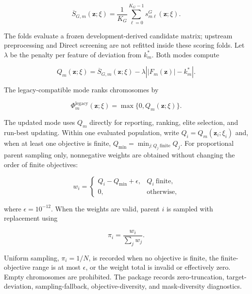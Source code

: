 \begin{equation}
\overline S_{G,m}(\mathbf z;\xi)=\frac{1}{K_G}\sum_{\ell=0}^{K_G-1}s^{G}_{m\ell}(\mathbf z;\xi).
\label{eq:ga-fold-score}
\end{equation}

The folds evaluate a frozen development-derived candidate matrix; upstream preprocessing and Direct screening are not refitted inside these scoring folds. Let \(\lambda\) be the penalty per feature of deviation from \(k_m^{\ast}\). Both modes compute

\begin{equation}
Q_m(\mathbf z;\xi)=\overline S_{G,m}(\mathbf z;\xi)-\lambda\left||F_m(\mathbf z)|-k_m^{\ast}\right|.
\label{eq:raw-objective}
\end{equation}

The legacy-compatible mode ranks chromosomes by

\begin{equation}
\Phi_m^{\mathrm{legacy}}(\mathbf z;\xi)=\max\{0,Q_m(\mathbf z;\xi)\}.
\label{eq:legacy-fitness}
\end{equation}

The updated mode uses \(Q_m\) directly for reporting, ranking, elite selection, and run-best updating. Within one evaluated population, write \(Q_i=Q_m(\mathbf z_i;\xi_i)\) and, when at least one objective is finite, \(Q_{\min}=\min_{j:Q_j\ \mathrm{finite}}Q_j\). For proportional parent sampling only, nonnegative weights are obtained without changing the order of finite objectives:

\begin{equation}
w_i=\begin{cases}
Q_i-Q_{\min}+\epsilon, & Q_i\ \mathrm{finite},\\
0, & \text{otherwise},
\end{cases}
\label{eq:shifted-weight}
\end{equation}

where \(\epsilon=10^{-12}\). When the weights are valid, parent \(i\) is sampled with replacement using

\begin{equation}
\pi_i=\frac{w_i}{\sum_jw_j}.
\label{eq:parent-probability}
\end{equation}

Uniform sampling, \(\pi_i=1/N\), is recorded when no objective is finite, the finite-objective range is at most \(\epsilon\), or the weight total is invalid or effectively zero. Empty chromosomes are prohibited. The package records zero-truncation, target-deviation, sampling-fallback, objective-diversity, and mask-diversity diagnostics.

